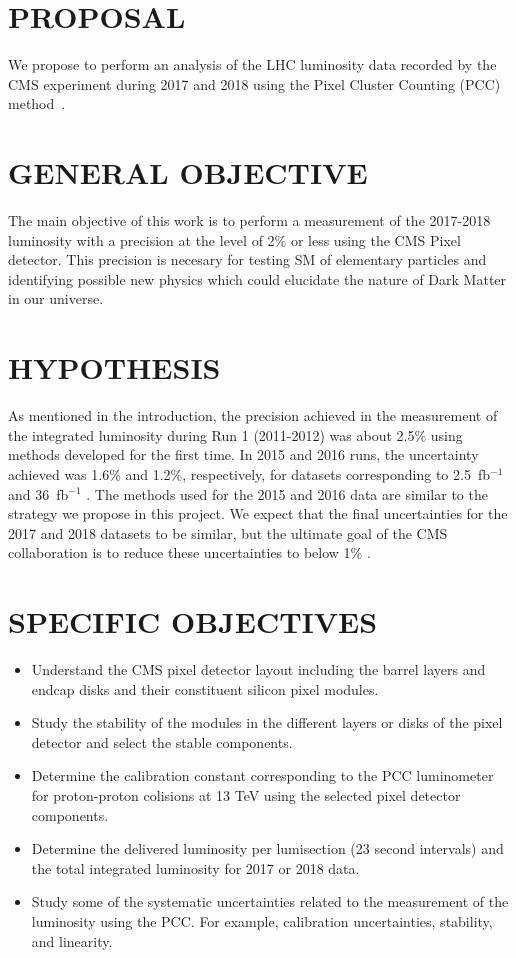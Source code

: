 \documentclass[final,12pt]{article}
\newcommand{\lumi}[1]{{#1~fb$^{-1}$}}
\begin{document}
\section{PROPOSAL}

We propose to perform an analysis of the LHC luminosity data recorded by the CMS experiment during 2017 and 2018 using the Pixel Cluster Counting (PCC) method~\cite{LUM12001}.  

\section{GENERAL OBJECTIVE}

The main objective of this work is to perform a measurement of the 2017-2018 luminosity with a precision at the level of 2\% or less using the CMS Pixel detector.
This precision is necesary for testing SM of elementary particles and identifying possible new physics which could elucidate the nature of Dark Matter in our universe. 


\section{HYPOTHESIS}

As mentioned in the introduction, the precision achieved in the measurement of the integrated luminosity during Run 1 (2011-2012) was about 2.5\% using  methods developed for the first time.
In 2015 and 2016 runs, the uncertainty achieved was 1.6\% and 1.2\%, respectively, for datasets corresponding to \lumi{2.5} and \lumi{36}  \cite{Sirunyan:2021qkt-corr}.
The methods used for the 2015 and 2016 data are similar to the strategy we propose in this project.
We expect that the final uncertainties for the 2017 and 2018 datasets to be similar, but the ultimate goal of the CMS collaboration is to reduce these uncertainties to below 1\%  \cite{Dainese:3}.




\section{SPECIFIC OBJECTIVES}

\begin{itemize}
\item Understand the CMS pixel detector layout including the barrel layers and endcap disks and their constituent silicon pixel modules.
\item Study the stability of the modules in the different layers or disks of the pixel detector and select the stable components.
\item Determine the calibration constant corresponding to the PCC luminometer for proton-proton colisions at 13 TeV using the selected pixel detector components.
\item Determine the delivered luminosity per lumisection (23 second intervals) and the total integrated luminosity for 2017 or 2018 data.
\item Study some of the systematic uncertainties related to the measurement of the luminosity using the PCC. For example, calibration uncertainties, stability, and linearity.
\end{itemize}
\end{document}
